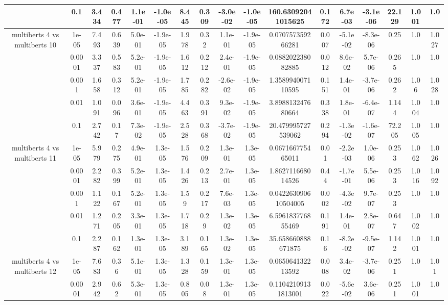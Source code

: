 \begin{tabular}{|c|c|c|c|c|c|c|c|c|c|c|c|c|c|c|c|c|}
 & 0.1 & 3.434 & 0.477 & 1.1e-01 & -1.0e-05 & 8.445 & 0.309 & -3.0e-02 & -1.0e-05 & 160.63092041015625 & 0.172 & 6.7e-03 & -3.1e-06 & 22.129 & 1.001 & 1.0 \\
\hline
\multirow{5}{*}{multiberts 4 vs multiberts 10} & 1e-05 & 7.493 & 0.639 & 5.0e-01 & -1.9e-05 & 1.978 & 0.32 & 1.1e-01 & -1.9e-05 & 0.070757359266281 & 0.007 & -5.1e-02 & -8.3e-06 & 0.25 & 1.0 & 1.027 \\
 & 0.0001 & 3.337 & 0.583 & 5.2e-01 & -1.9e-05 & 1.612 & 0.212 & 2.4e-01 & -1.9e-05 & 0.088202238082885 & 0.012 & 8.6e-02 & 5.7e-06 & 0.265 & 1.0 & 1.0 \\
 & 0.001 & 1.658 & 0.312 & 5.2e-01 & -1.9e-05 & 1.785 & 0.282 & -2.6e-02 & -1.9e-05 & 1.358994007110595 & 0.151 & 1.4e-01 & -3.7e-06 & 0.262 & 1.06 & 1.028 \\
 & 0.01 & 1.091 & 0.096 & 3.6e-01 & -1.9e-05 & 4.463 & 0.391 & 9.3e-02 & -1.9e-05 & 3.898813247680664 & 0.338 & 1.8e-01 & -6.4e-07 & 1.144 & 1.004 & 1.0 \\
 & 0.1 & 2.742 & 0.17 & 7.3e-02 & -1.9e-05 & 2.528 & 0.368 & -3.7e-02 & -1.9e-05 & 20.479995727539062 & 0.294 & -1.3e-02 & -1.6e-07 & 72.205 & 1.005 & 1.0 \\
\hline
\multirow{5}{*}{multiberts 4 vs multiberts 11} & 1e-05 & 5.979 & 0.275 & 4.9e-01 & 1.3e-05 & 1.576 & 0.209 & 1.3e-01 & 1.3e-05 & 0.067166775465011 & 0.01 & -2.2e-03 & 1.0e-06 & 0.253 & 1.062 & 1.026 \\
 & 0.0001 & 2.282 & 0.399 & 5.2e-01 & 1.3e-05 & 1.426 & 0.213 & 2.7e-01 & 1.3e-05 & 1.862711668014526 & 0.44 & -1.7e-01 & 5.5e-06 & 0.253 & 1.016 & 1.092 \\
 & 0.001 & 1.122 & 0.167 & 5.2e-01 & 1.3e-05 & 1.59 & 0.217 & 7.6e-03 & 1.3e-05 & 0.042263090610504005 & 0.002 & -4.3e-02 & 9.7e-07 & 0.253 & 1.0 & 1.0 \\
 & 0.01 & 1.271 & 0.205 & 3.3e-01 & 1.3e-05 & 1.718 & 0.29 & 1.3e-02 & 1.3e-05 & 6.596183776855469 & 0.191 & 1.4e-01 & 2.8e-07 & 0.647 & 1.002 & 1.0 \\
 & 0.1 & 2.287 & 0.162 & 1.3e-01 & 1.3e-05 & 3.189 & 0.165 & 1.3e-02 & 1.3e-05 & 35.658660888671875 & 0.16 & -8.2e-02 & -9.5e-07 & 1.142 & 1.001 & 1.0 \\
\hline
\multirow{5}{*}{multiberts 4 vs multiberts 12} & 1e-05 & 7.683 & 0.36 & 5.1e-01 & 1.3e-05 & 1.328 & 0.159 & 1.3e-01 & 1.3e-05 & 0.065064132213592 & 0.008 & 3.4e-02 & -3.7e-06 & 0.251 & 1.0 & 1.01 \\
 & 0.0001 & 2.942 & 0.62 & 5.3e-01 & 1.3e-05 & 0.805 & 0.08 & 1.3e-01 & 1.3e-05 & 0.11042109131813001 & 0.022 & -5.6e-02 & 3.6e-06 & 0.251 & 1.001 & 1.0 \\

\end{tabular}
